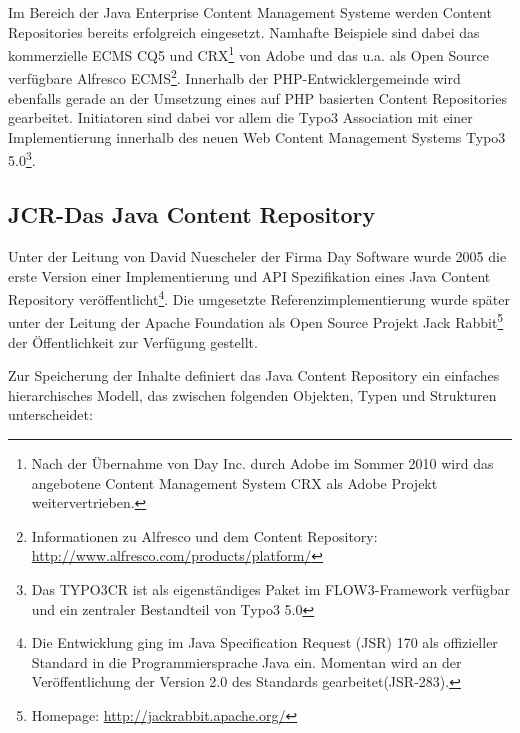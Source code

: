 Im Bereich der Java Enterprise Content Management Systeme werden Content Repositories bereits erfolgreich eingesetzt. Namhafte Beispiele sind dabei das kommerzielle ECMS CQ5 und CRX\footnote{Nach der Übernahme von Day Inc. durch Adobe im Sommer 2010 wird das angebotene Content Management System CRX als Adobe Projekt weitervertrieben.} von Adobe und das u.a. als Open Source verfügbare Alfresco ECMS\footnote{Informationen zu Alfresco und dem Content Repository: \href{http://www.alfresco.com/products/platform/}{http://www.alfresco.com/products/platform/}}.
Innerhalb der PHP-Entwicklergemeinde wird ebenfalls gerade an der Umsetzung eines auf PHP basierten Content Repositories gearbeitet. Initiatoren sind dabei vor allem die Typo3 Association mit einer Implementierung innerhalb des neuen Web Content Management Systems Typo3 5.0\footnote{Das TYPO3CR ist als eigenständiges Paket im FLOW3-Framework verfügbar und ein zentraler Bestandteil von Typo3 5.0}.


\subsection{JCR-Das Java Content Repository}

Unter der Leitung von David Nuescheler der Firma Day Software wurde 2005 die erste Version einer Implementierung und API Spezifikation eines Java Content Repository veröffentlicht\footnote{Die Entwicklung ging im Java Specification Request (JSR) 170 als offizieller Standard in die Programmiersprache Java ein. Momentan wird an der Veröffentlichung der Version 2.0 des Standards gearbeitet(JSR-283).}. Die umgesetzte Referenzimplementierung wurde später unter der Leitung der Apache Foundation als Open Source Projekt Jack Rabbit\footnote{Homepage: \href{http://jackrabbit.apache.org/}{http://jackrabbit.apache.org/}} der Öffentlichkeit zur Verfügung gestellt.

Zur Speicherung der Inhalte definiert das Java Content Repository ein einfaches hierarchisches Modell, das zwischen folgenden Objekten, Typen und Strukturen unterscheidet:


